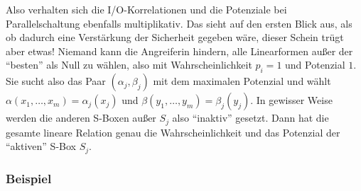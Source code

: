 \begin{refsegment}
Also verhalten sich die I/O-Korrelationen
und die Potenziale bei Parallelschaltung ebenfalls
multiplikativ. Das sieht auf den ersten Blick aus, als ob dadurch eine
Verstärkung der Sicherheit gegeben wäre, dieser Schein trügt aber etwas!
Niemand kann die Angreiferin hindern, alle Linearformen außer der "`besten"'
als Null zu wählen, also mit Wahrscheinlichkeit $p_i = 1$ und Potenzial $1$.
Sie sucht also das Paar $(\alpha_j, \beta_j)$ mit dem maximalen Potenzial
und wählt $\alpha(x_1, \ldots, x_m) = \alpha_j(x_j)$ und
$\beta(y_1, \ldots, y_m) = \beta_j(y_j)$. In gewisser Weise
werden die anderen S-Boxen außer $S_j$ also "`inaktiv"' gesetzt.
Dann hat die gesamte lineare Relation genau die Wahrscheinlichkeit und das
Potenzial der "`aktiven"' S-Box $S_j$.

\subsubsection*{Beispiel}


\end{refsegment}
